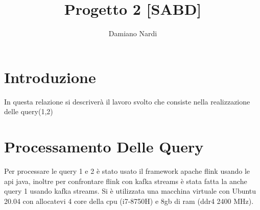 \documentclass[acmsmall]{acmart}
\begin{document}
\title{Progetto 2 [SABD]}

\author{Damiano Nardi}












 \maketitle{} 

\section{Introduzione}
In questa relazione si descriverà il lavoro svolto che consiste nella realizzazione delle query(1,2) 


\section{Processamento Delle Query}
Per processare le query 1 e 2 è stato usato il framework apache flink usando le api java, inoltre per confrontare flink con kafka streams è stata fatta la anche query 1 usando kafka streams.
Si è utilizzata una macchina virtuale con Ubuntu 20.04 con allocatevi 4 core della cpu (i7-8750H) e 8gb di ram (ddr4 2400 MHz).
\end{document}

